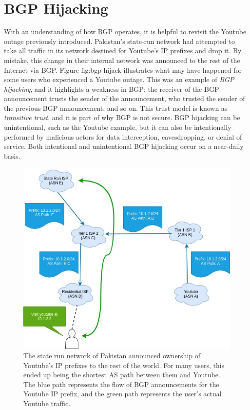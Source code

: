\documentclass[conference]{IEEEtran}
\begin{document}
\section{BGP Hijacking}
With an understanding of how BGP operates, it is helpful to revisit the Youtube outage previously introduced.  Pakistan's state-run network had attempted to take all traffic in its network destined for Youtube's IP prefixes and drop it.  By mistake, this change in their internal network was announced to the rest of the Internet via BGP.  Figure {fig:bgp-hijack} illustrates what may have happened for some users who experienced a Youtube outage.  This was an example of \emph{BGP hijacking}, and it highlights a weakness in BGP: the receiver of the BGP announcement trusts the sender of the announcement, who trusted the sender of the previous BGP announcement, and so on.  This trust model is known as \emph{transitive trust}, and it is part of why BGP is not secure.  BGP hijacking can be unintentional, such as the Youtube example, but it can also be intentionally performed by malicious actors for data interception, eavesdropping, or denial of service.  Both intentional and unintentional BGP hijacking occur on a near-daily basis\cite{b1}.

\begin{figure}[ht]
  \includegraphics[width=\linewidth]{images/bgp-hijack.jpg}
  \caption{The state run network of Pakistan announced ownership of Youtube's IP prefixes to the rest of the world.  For many users, this ended up being the shortest AS path between them and Youtube.  The blue path represents the flow of BGP announcements for the Youtube IP prefix, and the green path represents the user's actual Youtube traffic.}
  \label{fig:bgp-hijack}
\end{figure}
\end{document}

